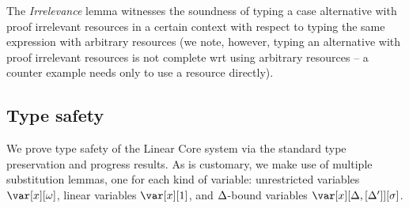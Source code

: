 \documentclass[acmsmall,review]{acmart}
\begin{document}


\WHNFConvSoundness

The \emph{Irrelevance} lemma witnesses the soundness of typing a
case alternative with proof irrelevant resources in a certain context with respect to
typing the same expression with arbitrary resources (we note, however, typing
an alternative with proof irrelevant resources is not complete wrt using
arbitrary resources -- a counter example needs only to use a resource
directly).


\subsection{Type safety\label{sec:type-safety-meta}}

We prove type safety of the Linear Core system via the standard type
preservation and progress results. As is customary, we make use of multiple
substitution lemmas, one for each kind of variable: unrestricted variables
$\xo$, linear variables $\xl$, and $\Delta$-bound variables $\xD$.
\end{document}
